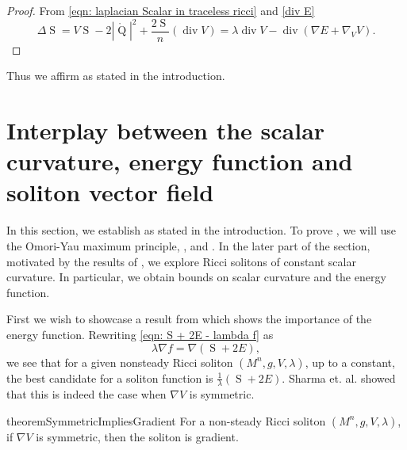 \documentclass{amsart}
\newcommand{\abs}[1]{\left| #1 \right|}
\newcommand{\lie}[1]{\mathcal{L}_{#1}}
\DeclareMathOperator*{\Qricci}{Q}
\DeclareMathOperator*{\scalar}{S}
\DeclareMathOperator*{\divergence}{div}
\theoremstyle{plain}
\theoremstyle{plain}
\theoremstyle{plain}
\theoremstyle{plain}
\theoremstyle{remark}
\begin{document}
\scalarEnergyNongradient*
\begin{proof}
From \cref{eqn: laplacian Scalar in traceless ricci} and \cref{div E}
\begin{equation*}
	\Delta \scalar 
		= V\scalar -2 \abs{\mathring{\Qricci}}^2 + \frac{2\scalar}{n} (\divergence V) 
		= \lambda \divergence V -\divergence (\nabla E + \nabla_V V).
\end{equation*}

\end{proof}
Thus we  affirm   as stated in the introduction.




\section{Interplay between the scalar curvature, energy function and soliton vector field}\label{main}
In this section, we establish %
 as stated in the introduction.   
To prove , we will use the Omori-Yau maximum principle,
, and 
.
In the later part of the section, motivated by the results of \cite{MR2507581}, we explore Ricci solitons of constant scalar curvature. In particular, we obtain  
bounds on scalar curvature and the energy function. 

First we wish to showcase a result from \cite{MR3721584} which shows the importance of the energy function. 
Rewriting \cref{eqn: S + 2E - lambda f} as 
$$ \lambda \nabla f = \nabla ( \scalar + 2E ), $$
we see that for a given nonsteady Ricci soliton $(M^n,g,V,\lambda)$, up to a constant, the best candidate for a soliton function is $\frac{1}{\lambda} (\scalar + 2E)$.
Sharma et. al. showed that this is indeed the case when $\nabla V$ is symmetric. 

\begin{restatable}{theorem}{SymmetricImpliesGradient}
	\label{thm: nabla V symmetric implies gradient}
    For a non-steady Ricci soliton $(M^n,g,V,\lambda)$, if $\nabla V$ is symmetric, then the soliton is gradient.
\end{restatable}
\end{document}
